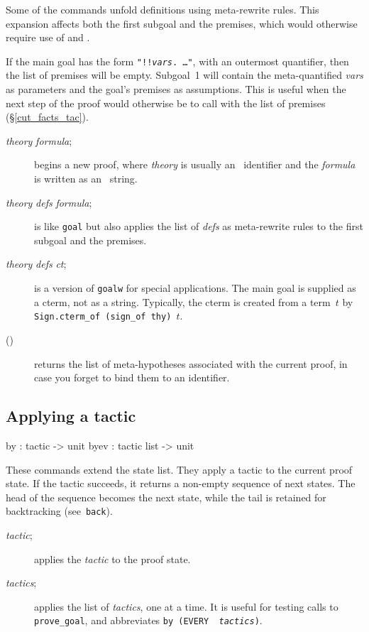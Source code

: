 Some of the commands unfold definitions using meta-rewrite rules.  This
expansion affects both the first subgoal and the premises, which would
otherwise require use of  and
.

If the main goal has the form {\tt"!!{\it vars}.\ \ldots"}, with an outermost
quantifier, then the list of premises will be empty.  Subgoal~1 will
contain the meta-quantified {\it vars\/} as parameters and the goal's premises
as assumptions.  This is useful when the next step of the proof would
otherwise be to call  with the list of premises
(\S\ref{cut_facts_tac}).

\begin{description}
\item[ {\it theory} {\it formula}; ] 
begins a new proof, where {\it theory} is usually an \ML\ identifier
and the {\it formula\/} is written as an \ML\ string.

\item[ {\it theory} {\it defs} {\it formula}; ] 
is like {\tt goal} but also applies the list of {\it defs\/} as
meta-rewrite rules to the first subgoal and the premises.

\item[ {\it theory} {\it defs} {\it ct}; ] 
is a version of {\tt goalw} for special applications.  The main goal is
supplied as a cterm, not as a string.  Typically, the cterm is created from
a term~$t$ by \hbox{\tt Sign.cterm_of (sign_of thy) $t$}.

\item[()] 
returns the list of meta-hypotheses associated with the current proof, in
case you forget to bind them to an \ML{} identifier.
\end{description}

\subsection{Applying a tactic}
\begin{ttbox} 
by   : tactic -> unit
byev : tactic list -> unit
\end{ttbox}
These commands extend the state list.  They apply a tactic to the current
proof state.  If the tactic succeeds, it returns a non-empty sequence of
next states.  The head of the sequence becomes the next state, while the
tail is retained for backtracking (see~{\tt back}).
\begin{description} \item[ {\it tactic}; ] 
applies the {\it tactic\/} to the proof state.

\item[ {\it tactics}; ] 
applies the list of {\it tactics}, one at a time.  It is useful for testing
calls to {\tt prove_goal}, and abbreviates \hbox{\tt by (EVERY {\it
tactics})}.
\end{description}

